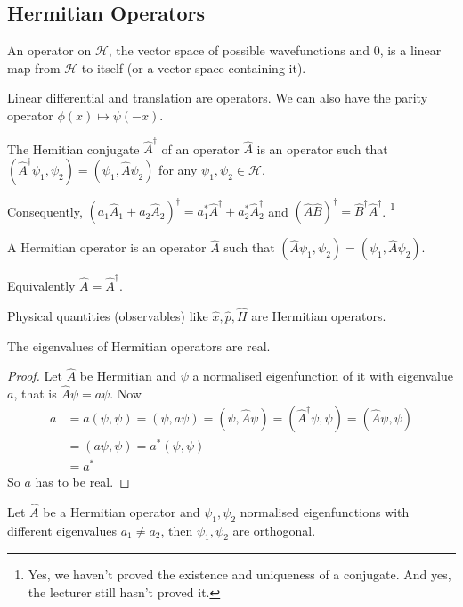 \subsection{Hermitian Operators}
An operator on $\mathcal H$, the vector space of possible wavefunctions and $0$, is a linear map from $\mathcal H$ to itself (or a vector space containing it).
\begin{example}
    Linear differential and translation are operators.
    We can also have the parity operator $\phi(x)\mapsto\psi(-x)$.
\end{example}
\begin{definition}
    The Hemitian conjugate $\hat{A}^\dagger$ of an operator $\hat{A}$ is an operator such that $(\hat{A}^\dagger\psi_1,\psi_2)=(\psi_1,\hat{A}\psi_2)$ for any $\psi_1,\psi_2\in\mathcal H$.
\end{definition}
Consequently, $(a_1\hat{A}_1+a_2\hat{A}_2)^\dagger=a_1^*\hat{A}^\dagger+a_2^*\hat{A}_2^\dagger$ and $(\hat{A}\hat{B})^\dagger=\hat{B}^\dagger\hat{A}^\dagger$.
\footnote{Yes, we haven't proved the existence and uniqueness of a conjugate. And yes, the lecturer still hasn't proved it.}
\begin{definition}
    A Hermitian operator is an operator $\hat{A}$ such that $(\hat{A}\psi_1,\psi_2)=(\psi_1,\hat{A}\psi_2)$.
\end{definition}
Equivalently $\hat{A}=\hat{A}^\dagger$.
\begin{example}
    Physical quantities (observables) like $\hat{x},\hat{p},\hat{H}$ are Hermitian operators.
\end{example}
\begin{theorem}
    The eigenvalues of Hermitian operators are real.
\end{theorem}
\begin{proof}
    Let $\hat{A}$ be Hermitian and $\psi$ a normalised eigenfunction of it with eigenvalue $a$, that is $\hat{A}\psi=a\psi$.
    Now
    \begin{align*}
        a&=a(\psi,\psi)=( \psi,a\psi)=(\psi,\hat{A}\psi)=( \hat{A}^\dagger\psi,\psi)=(\hat{A}\psi,\psi)\\
        &=( a\psi,\psi)=a^*(\psi,\psi)\\
        &=a^*
    \end{align*}
    So $a$ has to be real.
\end{proof}
\begin{theorem}
    Let $\hat{A}$ be a Hermitian operator and $\psi_1,\psi_2$ normalised eigenfunctions with different eigenvalues $a_1\neq a_2$, then $\psi_1,\psi_2$ are orthogonal.
\end{theorem}
